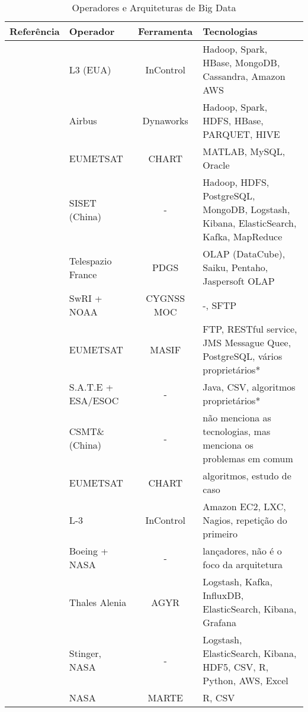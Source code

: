 \begin{table}[!ht]%
  \begin{center}
  \caption{Operadores e Arquiteturas de Big Data}
  \begin{tabular}{|m{8em}|m{6em}|c|m{10em}|}
			\hline
			Referência & Operador & Ferramenta & Tecnologias \\
			\hline
			\cite{adamskiDataAnalyticsLarge2016} & L3 (EUA) & InControl & Hadoop, Spark, HBase, MongoDB, Cassandra, Amazon AWS \\
			\hline
			\cite{boussoufBigDataBased2018} & Airbus & Dynaworks & Hadoop, Spark, HDFS, HBase, PARQUET, HIVE \\
			\hline
			\cite{schulsterCHARTingFutureOffline2018} & EUMETSAT & CHART & MATLAB, MySQL, Oracle \\
			\hline
			\cite{zhangBigDataFramework2017} & SISET (China) & - & Hadoop, HDFS, PostgreSQL, MongoDB, Logstash, Kibana, ElasticSearch, Kafka, MapReduce \\
			\hline
			\cite{yvernesCopernicusGroundSegment2018} & Telespazio France & PDGS & OLAP (DataCube), Saiku, Pentaho, Jaspersoft OLAP \\
			\hline
			\cite{dischnerCYGNSSMOCMeeting2016} & SwRI + NOAA & CYGNSS MOC & -, SFTP \\
			\hline
			\cite{edwardsDealingBigData2018} & EUMETSAT & MASIF & FTP, RESTful service, JMS Messague Quee, PostgreSQL, vários proprietários* \\
			\hline
			\cite{evansDataMiningDrastically2016} & S.A.T.E + ESA/ESOC & - & Java, CSV, algoritmos proprietários* \\
			\hline
			\cite{fenManagementOperationCommunication2016} & CSMT\& (China) & - & não menciona as tecnologias, mas menciona os problemas em comum \\
			\hline
			\cite{trollopeAnalysisAutomatedTechniques2018} & EUMETSAT & CHART & algoritmos, estudo de caso \\
			\hline
			\cite{gillesFlyingLargeConstellations2016} & L-3 & InControl & Amazon EC2, LXC, Nagios, repetição do primeiro \\
			\hline
			\cite{highsmithSpaceLaunchSystem2015} & Boeing + NASA & - & lançadores, não é o foco da arquitetura \\
			\hline
			\cite{hennionBigdataSatelliteYearly2018} & Thales Alenia & AGYR & Logstash, Kafka, InfluxDB, ElasticSearch, Kibana, Grafana \\
			\hline
			\cite{mateikUsingBigData2017} & Stinger, NASA & - & Logstash, ElasticSearch, Kibana, HDF5, CSV, R, Python, AWS, Excel \\
			\hline
			\cite{fernandezTelemetryAnomalyDetection2017} & NASA & MARTE & R, CSV \\
			\hline
    \end{tabular}
    \end{center}
\end{table}


